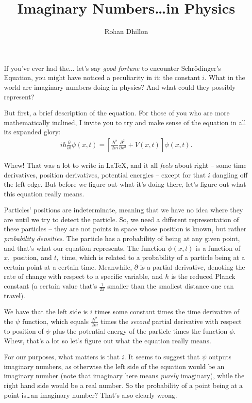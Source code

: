 \documentclass{article}
\title{Imaginary Numbers\dots in Physics}
\author{Rohan Dhillon}
\begin{document}
\maketitle
If you've ever had the... let's say \textit{good fortune} to encounter Schrödinger's Equation, you might have noticed a peculiarity in it: the constant $i$. What in the world are imaginary numbers doing in physics? And what could they possibly represent?

But first, a brief description of the equation. For those of you who are more mathematically inclined, I invite you to try and make sense of the equation in all its expanded glory:
\begin{align*}
    i\hbar \frac{\partial}{\partial t} \psi (x,t)=\left[ \frac{\hbar^2}{2m}\frac{\partial^2}{\partial x^2}+V(x,t)\right] \psi (x,t).
\end{align*}
    
Whew! That was a lot to write in \LaTeX, and it all \textit{feels} about right -- some time derivatives, position derivatives, potential energies -- except for that $i$ dangling off the left edge. But before we figure out what it's doing there, let's figure out what this equation really means. 

Particles' positions are indeterminate, meaning that we have no idea where they are until we try to detect the particle.
So, we need a different representation of these particles -- they are not points in space whose position is known, but rather \textit{probability densities}. 
The particle has a probability of being at any given point, and that's what our equation represents. The function $\psi(x,t)$ is a function of $x,$ position, and $t,$ time, which is related to a probability of a particle being at a certain point at a certain time. Meanwhile, $\partial$ is a partial derivative, denoting the rate of change with respect to a specific variable, and $\hbar$ is the reduced Planck constant (a certain value that's $\frac{1}{2\pi}$ smaller than the smallest distance one can travel).

We have that the left side is $i$ times some constant times the time derivative of the $\psi$ function, which equals $\frac{\hbar^2}{2m}$ times the \textit{second} partial derivative with respect to position of $\psi$ plus the potential energy of the particle times the function $\phi.$ Whew, that's a lot so let's figure out what the equation really means.

For our purposes, what matters is that $i.$ It seems to suggest that $\psi$ outputs imaginary numbers, as otherwise the left side of the equation would be an imaginary number (note that imaginary here means \textit{purely} imaginary), while the right hand side would be a real number. So the probability of a point being at a point is\dots an imaginary number? That's also clearly wrong. 
\end{document}
